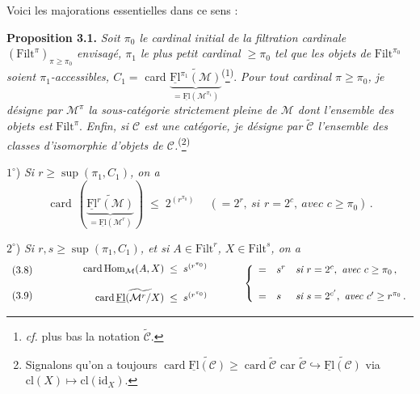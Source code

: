\documentclass[11pt]{article}
\newcommand{\msp}[1]{\marginpar{\footnotesize [#1]}}
\newcommand{\uFl}{\underline{\mathrm{Fl}}}
\newcommand{\cM}{\mathcal{M}}
\newcommand{\Filt}{\mathrm{Filt}}
\newcommand{\card}{\operatorname{card}}
\newcommand{\pfn}[2]{\textsuperscript{(}\footnote[#1]{#2}\textsuperscript{)}}
\begin{document}
\msp{page 19}

Voici les majorations essentielles dans ce sens :

\textbf{Proposition 3.1.} \textit{Soit $\pi_0$ le cardinal initial de la filtration cardinale} $(\Filt^\pi)_{\pi\geq\pi_0}$ \textit{envisagé, $\pi_1$ le plus petit cardinal $\geq\pi_0$ tel que les objets de} $\Filt^{\pi_0}$ \textit{soient $\pi_1$-accessibles, $C_1=$} card $\underbrace{\widetilde{\uFl^{\pi_1}(\cM)}}_{=\uFl(\cM^{\pi_1})}$\pfn{4}{\textit{cf.} plus bas la notation $\widetilde{\mathcal{C}}$.}. \textit{Pour tout cardinal $\pi\geq\pi_0$, je désigne par $\cM^\pi$ la sous-catégorie strictement pleine de $\cM$ dont l'ensemble des objets est} $\Filt^\pi$. \textit{Enfin, si $\mathcal{C}$ est une catégorie, je désigne par $\widetilde{\mathcal{C}}$ l'ensemble des classes d'isomorphie d'objets de $\mathcal{C}$.}\pfn{5}{Signalons qu'on a toujours $\card\widetilde{\uFl(\mathcal{C})}\geq\card\widetilde{\mathcal{C}}$ car $\widetilde{\mathcal{C}}\hookrightarrow\widetilde{\uFl(\mathcal{C})}$ via $\mathrm{cl}(X)\longmapsto\mathrm{cl}(\mathrm{id}_X)$.}

$1^\circ$) \textit{Si $r\geq\sup(\pi_1,C_1)$, on a}
\[
\card\,(\underbrace{\widetilde{\uFl^r(\cM)}}_{=\uFl(\cM^r)}) \;\leq\; 2^{(r^{\pi_0})} \quad\ (=2^r,\ \textit{si } r=2^c,\ \textit{avec } c\geq\pi_0)\,.
\tag*{(3.7)}
\]

$2^\circ$) \textit{Si $r,s\geq\sup(\pi_1,C_1)$, et si $A\in\Filt^r$, $X\in\Filt^s$, on a}
\[
\begin{array}{l}
\text{(3.8)}\\[3ex]
\text{(3.9)}
\end{array}
\qquad\qquad
\begin{array}{r@{\;\;\leq\;\;}l}
\card\mathrm{Hom}_{\cM}(A,X) & s^{(r^{\pi_0})}\\[3ex]
\card\widetilde{\uFl(\cM^r/X)} & s^{(r^{\pi_0})}
\end{array}
\qquad\quad
\left\{
\begin{array}{lll}
= & s^r & \textit{si } r=2^c,\ \textit{avec } c\geq\pi_0\,,\\[3ex]
= & s & \textit{si } s=2^{c'},\ \textit{avec } c'\geq r^{\pi_0}\,.
\end{array}
\right.
\]
\end{document}
